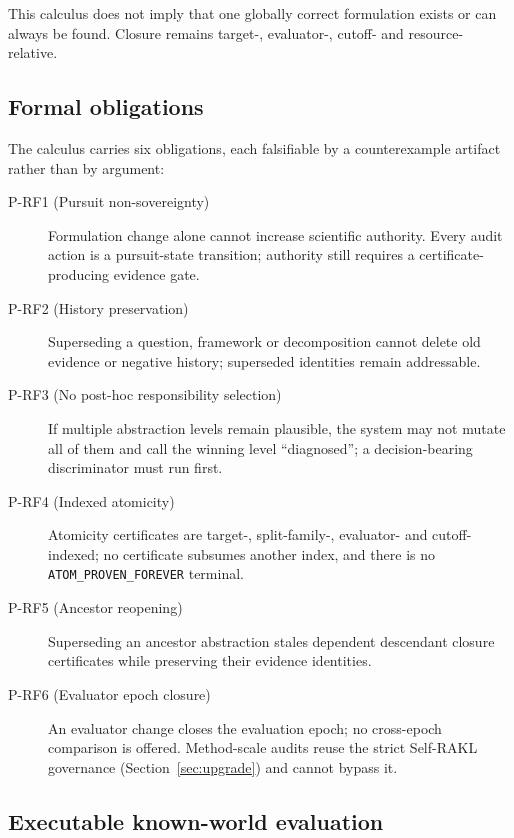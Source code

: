 This calculus does not imply that one globally correct formulation exists or can always be found.
Closure remains target-, evaluator-, cutoff- and resource-relative.

\subsection{Formal obligations}
\label{sec:recursive-formulation-obligations}

The calculus carries six obligations, each falsifiable by a counterexample artifact rather than
by argument:

\begin{description}
\item[P-RF1 (Pursuit non-sovereignty)] Formulation change alone cannot increase scientific
  authority. Every audit action is a pursuit-state transition; authority still requires a
  certificate-producing evidence gate.
\item[P-RF2 (History preservation)] Superseding a question, framework or decomposition cannot
  delete old evidence or negative history; superseded identities remain addressable.
\item[P-RF3 (No post-hoc responsibility selection)] If multiple abstraction levels remain
  plausible, the system may not mutate all of them and call the winning level ``diagnosed'';
  a decision-bearing discriminator must run first.
\item[P-RF4 (Indexed atomicity)] Atomicity certificates are target-, split-family-, evaluator-
  and cutoff-indexed; no certificate subsumes another index, and there is no
  \texttt{ATOM\_PROVEN\_FOREVER} terminal.
\item[P-RF5 (Ancestor reopening)] Superseding an ancestor abstraction stales dependent descendant
  closure certificates while preserving their evidence identities.
\item[P-RF6 (Evaluator epoch closure)] An evaluator change closes the evaluation epoch; no
  cross-epoch comparison is offered. Method-scale audits reuse the strict Self-RAKL governance
  (Section~\ref{sec:upgrade}) and cannot bypass it.
\end{description}

\subsection{Executable known-world evaluation}
\label{sec:recursive-formulation-evaluation}

